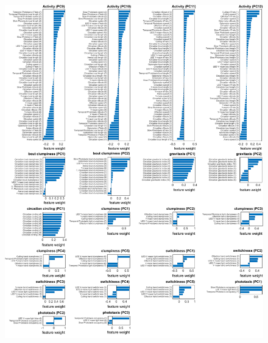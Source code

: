 \documentclass[12pt,letterpaper]{article}
\begin{document}
\clearpage
\begin{figure}[t!]
    \includegraphics[width=\textwidth]{../figures/chapter_3/fig_s6-3.pdf}
\end{figure}
\clearpage
\end{document}
